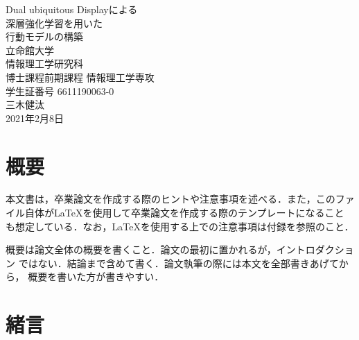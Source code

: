 \documentclass[12pt]{sonota/aislab}
\begin{document}

\begin{titlepage}
\centering
\vspace*{3truecm}
\Huge
Dual ubiquitous Displayによる\\
深層強化学習を用いた\\
行動モデルの構築\\
\vfill
\Large
立命館大学\\
情報理工学研究科\\
博士課程前期課程 情報理工学専攻\\[1zh]
学生証番号 6611190063-0\\[0.5zh]
{\LARGE{三木健汰}}\\[2zh]
2021年2月8日
\end{titlepage}


\let\cleardoublepage\clearpage

\frontmatter

\clearpage
{}
\chapter*{概要}
本文書は，卒業論文を作成する際のヒントや注意事項を述べる．また，このファ
イル自体が{\LaTeX}を使用して卒業論文を作成する際のテンプレートになること
も想定している．なお，{\LaTeX}を使用する上での注意事項は付録を参照のこと．

概要は論文全体の概要を書くこと．論文の最初に置かれるが，イントロダクション
ではない．結論まで含めて書く．論文執筆の際には本文を全部書きあげてから，
概要を書いた方が書きやすい．

\clearpage
{}
\bgroup

\tableofcontents
\clearpage
{}
\listoffigures 
\clearpage
{}
\listoftables

\egroup

\mainmatter

\chapter{緒言}\label{chap:introduction}
\end{document}
